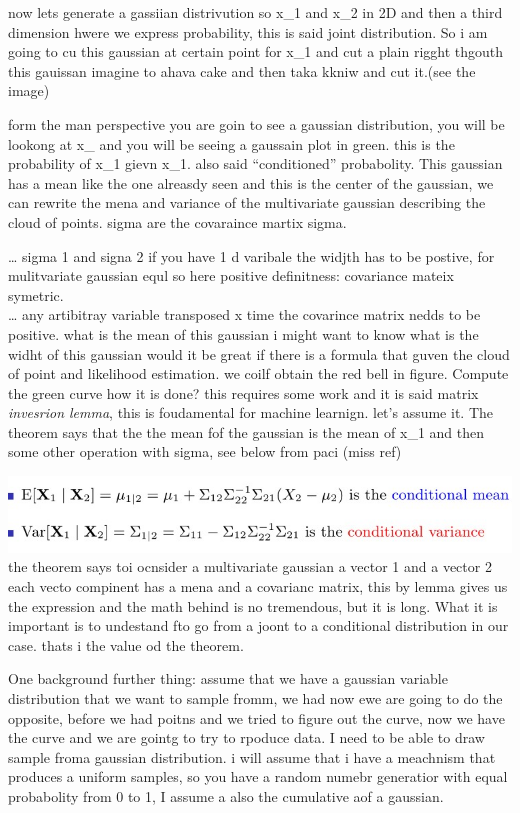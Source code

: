 \documentclass[
  12pt,
  a4paper,
  oneside]{book}
\theoremstyle{definition}
\theoremstyle{definition}
\theoremstyle{definition}
\theoremstyle{remark}
\begin{document}
now lets generate a gassiian distrivution so x\_1 and x\_2 in 2D and then a third dimension hwere we express probability, this is said joint distribution. So i am going to cu this gaussian at certain point for x\_1 and cut a plain rigght thgouth this gauissan imagine to ahava cake and then taka kkniw and cut it.(see the image)

form the man perspective you are goin to see a gaussian distribution, you will be lookong at x\_ and you will be seeing a gaussain plot in green. this is the probability of x\_1 gievn x\_1. also said ``conditioned'' probabolity. This gaussian has a mean like the one alreasdy seen and this is the center of the gaussian, we can rewrite the mena and variance of the multivariate gaussian describing the cloud of points. sigma are the covaraince martix sigma.

\ldots{}
sigma 1 and signa 2 if you have 1 d varibale the widjth has to be postive, for mulitvariate gaussian equl so here positive definitness: covariance mateix symetric.\\
\ldots{}
any artibitray variable transposed x time the covarince matrix nedds to be positive.
what is the mean of this gaussian i might want to know what is the widht of this gaussian would it be great if there is a formula that guven the cloud of point and likelihood estimation. we coilf obtain the red bell in figure.
Compute the green curve how it is done? this requires some work and it is said matrix \emph{invesrion lemma}, this is foudamental for machine learnign. let's assume it. The theorem says that the the mean fof the gaussian is the mean of x\_1 and then some other operation with sigma, see below from paci (miss ref)

\includegraphics{appendix_images/inverse_lemma.jpg}
the theorem says toi ocnsider a multivariate gaussian a vector 1 and a vector 2 each vecto compinent has a mena and a covarianc matrix, this by lemma gives us the expression and the math behind is no tremendous, but it is long. What it is important is to undestand fto go from a joont to a conditional distribution in our case. thats i the value od the theorem.

One background further thing: assume that we have a gaussian variable distribution that we want to sample fromm, we had now ewe are going to do the opposite, before we had poitns and we tried to figure out the curve, now we have the curve and we are gointg to try to rpoduce data. I need to be able to draw sample froma gaussian distribution. i will assume that i have a meachnism that produces a uniform samples, so you have a random numebr generatior with equal probabolity from 0 to 1, I assume a also the cumulative aof a gaussian.
\end{document}
